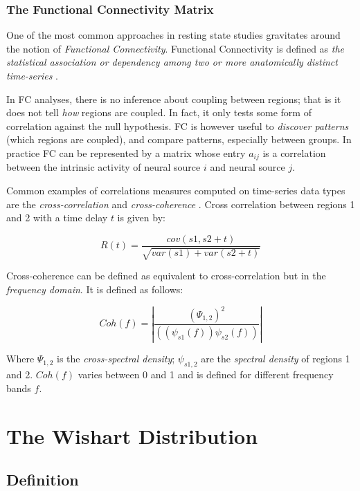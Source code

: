 \documentclass[12pt,openright,twoside,a4paper]{book}
\begin{document}
\subsection{The Functional Connectivity Matrix}

One of the most common approaches in resting state studies gravitates around the notion of \textit{Functional Connectivity}.
Functional Connectivity is defined as \textit{the statistical association or dependency among two or more anatomically distinct time-series} \cite{connect}.

In FC analyses, there is no inference about coupling between regions; that is it does not tell \textit{how} regions are coupled.
In fact, it only tests some form of correlation against the null hypothesis.
FC is however useful to \textit{discover patterns} (which regions are coupled), and compare patterns, especially between groups.
In practice FC can be represented by a matrix whose entry $a_{ij}$ is a correlation between the intrinsic activity of neural source $i$ and neural source $j$.

Common examples of correlations measures computed on time-series data types are the \textit{cross-correlation} and \textit{cross-coherence} \cite{connect}.
Cross correlation between regions 1 and 2 with a time delay $t$ is given by:

\begin{equation}
R(t)= \frac{cov(s1,s2+t)}{\sqrt{var(s1)+var(s2+t)}}
\end{equation}

Cross-coherence can be defined as equivalent to cross-correlation but in the \textit{frequency domain}. It is defined as follows:

\begin{equation}
Coh(f) = | \frac{(\Psi_{1,2})^2}  {((\psi_{s1}(f))\psi_{s2}(f))} |
\end{equation}

Where $\Psi_{1,2}$ is the \textit{cross-spectral density}; $\psi_{s1,2}$ are the \textit{spectral density} of regions 1 and 2. $Coh(f)$ varies between 0 and 1 and is defined for different frequency bands $f$.

\chapter{The Wishart Distribution}

\section{Definition}
\end{document}
